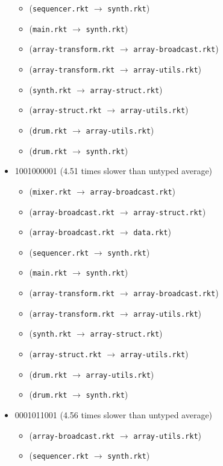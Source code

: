 \documentclass{article}
\newcommand{\mono}[1]{\texttt{#1}}
\begin{document}
\begin{itemize}
\begin{itemize}
  \item (\mono{sequencer.rkt} $\rightarrow$ \mono{synth.rkt})
  \item (\mono{main.rkt} $\rightarrow$ \mono{synth.rkt})
  \item (\mono{array-transform.rkt} $\rightarrow$ \mono{array-broadcast.rkt})
  \item (\mono{array-transform.rkt} $\rightarrow$ \mono{array-utils.rkt})
  \item (\mono{synth.rkt} $\rightarrow$ \mono{array-struct.rkt})
  \item (\mono{array-struct.rkt} $\rightarrow$ \mono{array-utils.rkt})
  \item (\mono{drum.rkt} $\rightarrow$ \mono{array-utils.rkt})
  \item (\mono{drum.rkt} $\rightarrow$ \mono{synth.rkt})
  \end{itemize}
\item 1001000001 (4.51 times slower than untyped average)
  \begin{itemize}
  \item (\mono{mixer.rkt} $\rightarrow$ \mono{array-broadcast.rkt})
  \item (\mono{array-broadcast.rkt} $\rightarrow$ \mono{array-struct.rkt})
  \item (\mono{array-broadcast.rkt} $\rightarrow$ \mono{data.rkt})
  \item (\mono{sequencer.rkt} $\rightarrow$ \mono{synth.rkt})
  \item (\mono{main.rkt} $\rightarrow$ \mono{synth.rkt})
  \item (\mono{array-transform.rkt} $\rightarrow$ \mono{array-broadcast.rkt})
  \item (\mono{array-transform.rkt} $\rightarrow$ \mono{array-utils.rkt})
  \item (\mono{synth.rkt} $\rightarrow$ \mono{array-struct.rkt})
  \item (\mono{array-struct.rkt} $\rightarrow$ \mono{array-utils.rkt})
  \item (\mono{drum.rkt} $\rightarrow$ \mono{array-utils.rkt})
  \item (\mono{drum.rkt} $\rightarrow$ \mono{synth.rkt})
  \end{itemize}
\item 0001011001 (4.56 times slower than untyped average)
  \begin{itemize}
  \item (\mono{array-broadcast.rkt} $\rightarrow$ \mono{array-utils.rkt})
  \item (\mono{sequencer.rkt} $\rightarrow$ \mono{synth.rkt})

\end{itemize}
\end{itemize}
\end{document}
